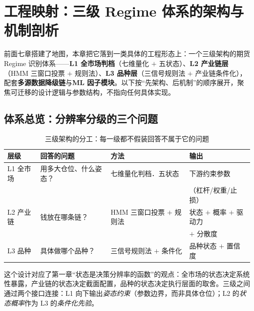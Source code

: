 
\section{工程映射：三级 Regime 体系的架构与机制剖析}
\label{sec:engineering}

前面七章搭建了地图，本章把它落到一类具体的工程形态上：一个三级架构的期货 Regime 识别体系——\textbf{L1 全市场判档}（七维量化 $+$ 五状态）、\textbf{L2 产业链层}（HMM 三窗口投票 $+$ 规则法）、\textbf{L3 品种层}（三信号规则法 $+$ 产业链条件化），配套\textbf{多源数据降级链}与\textbf{ML 因子模块}。以下按“先架构、后机制”的顺序展开，聚焦可迁移的设计逻辑与参数结构，不指向任何具体实现。

\subsection{体系总览：分辨率分级的三个问题}

\begin{table}[htbp]
\centering
\footnotesize
\begin{tabular}{>{\raggedright\arraybackslash}p{2.1cm}>{\raggedright\arraybackslash}p{3.0cm}>{\raggedright\arraybackslash}p{3.7cm}>{\raggedright\arraybackslash}p{2.9cm}}
\toprule
\textbf{层级} & \textbf{回答的问题} & \textbf{方法} & \textbf{输出} \\
\midrule
L1 全市场 & 用多大仓位、什么姿态？ & 七维量化判档．五状态 & 下游约束参数 \\
 & & & （杠杆/权重/止损） \\
L2 产业链 & 钱放在哪条链？ & HMM 三窗口投票 $+$ 规则法 & 状态 $+$ 概率 $+$ 驱动力 \\
 & & & $+$ 分散度 \\
L3 品种 & 具体做哪个品种？ & 三信号规则法 $+$ 条件化 & 品种状态 $+$ 置信度 \\
\bottomrule
\end{tabular}
\caption{三级架构的分工：每一级都不假装回答不属于它的问题}
\label{tab:three-levels}
\end{table}

这个设计对应了第一章“状态是决策分辨率的函数”的观点：全市场的状态决定系统性暴露，产业链的状态决定截面配置，品种的状态决定执行层面的取舍。三级之间通过两个接口连接：L1 向下输出\emph{姿态约束}（参数边界，而非具体仓位）；L2 的\emph{状态概率}作为 L3 的\emph{条件化先验}。

